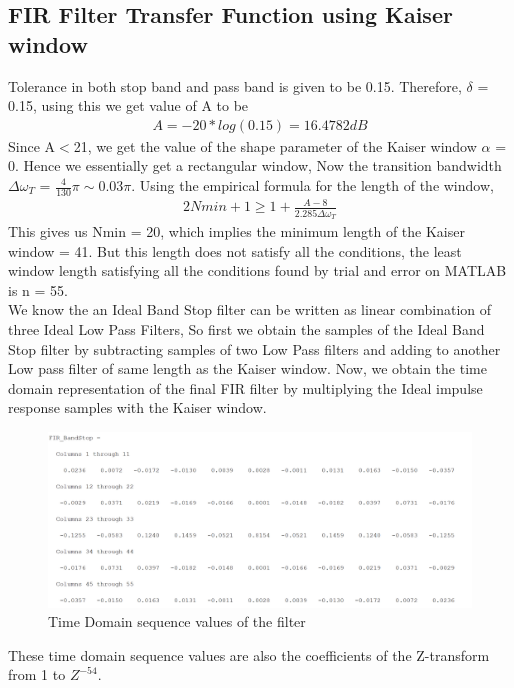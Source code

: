 \documentclass[12pt]{article}
\begin{document}
\subsection{FIR Filter Transfer Function using Kaiser window}
\color{black}
Tolerance in both stop band and pass band is given to be 0.15. Therefore, $\delta$ = 0.15, using this we get value of A to be
\begin{gather*}
	A = -20*log(0.15) = 16.4782 dB
\end{gather*}
Since A$<$21, we get the value of the shape parameter of the Kaiser window $\alpha$ = 0. Hence we essentially get a rectangular window, Now the transition bandwidth $\Delta\omega_T$ = $\frac{4}{130} \pi \sim 0.03\pi$. Using the empirical formula for the length of the window,
\begin{gather*}
	2Nmin + 1 \ge 1 + \frac{A-8}{2.285\Delta\omega_T}
\end{gather*}
This gives us Nmin = 20, which implies the minimum length of the Kaiser window = 41. But this length does not satisfy all the conditions, the least window length satisfying all the conditions found by trial and error on MATLAB is n = 55.\\
We know the an Ideal Band Stop filter can be written as linear combination of three Ideal Low Pass Filters, So first we obtain the samples of the Ideal Band Stop filter by subtracting samples of two Low Pass filters and adding to another Low pass filter of same length as the Kaiser window. Now, we obtain the time domain representation of the final FIR filter by multiplying the Ideal impulse response samples with the Kaiser window.
\begin{figure}[H]
	\centering
	\includegraphics[width  = 18cm]{Filter2hn.png}
	\caption{Time Domain sequence values of the filter}
\end{figure}
\noindent These time domain sequence values are also the coefficients of the Z-transform from 1 to $Z^{-54}$.
\end{document}
